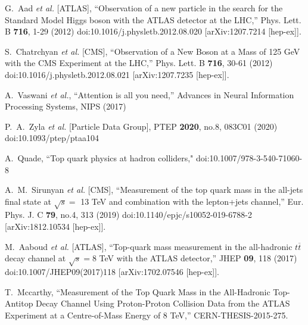 \begin{thebibliography}{99}

G.~Aad \textit{et al.} [ATLAS],
``Observation of a new particle in the search for the Standard Model Higgs boson with the ATLAS detector at the LHC,''
Phys. Lett. B \textbf{716}, 1-29 (2012)
doi:10.1016/j.physletb.2012.08.020
[arXiv:1207.7214 [hep-ex]].

S.~Chatrchyan \textit{et al.} [CMS],
``Observation of a New Boson at a Mass of 125 GeV with the CMS Experiment at the LHC,''
Phys. Lett. B \textbf{716}, 30-61 (2012)
doi:10.1016/j.physletb.2012.08.021
[arXiv:1207.7235 [hep-ex]].

A.~Vaswani \textit{et al.},
``Attention is all you need,''
Advances in Neural Information Processing Systems, NIPS (2017)

P.~A.~Zyla \textit{et al.} [Particle Data Group],
PTEP \textbf{2020}, no.8, 083C01 (2020)
doi:10.1093/ptep/ptaa104

A.~Quade,
``Top quark physics at hadron colliders,"
doi:10.1007/978-3-540-71060-8

A.~M.~Sirunyan \textit{et al.} [CMS],
``Measurement of the top quark mass in the all-jets final state at $\sqrt{s} =$ 13 TeV and combination with the lepton+jets channel,''
Eur. Phys. J. C \textbf{79}, no.4, 313 (2019)
doi:10.1140/epjc/s10052-019-6788-2
[arXiv:1812.10534 [hep-ex]].

M.~Aaboud \textit{et al.} [ATLAS],
``Top-quark mass measurement in the all-hadronic $ t\overline{t} $ decay channel at $ \sqrt{s}=8 $ TeV with the ATLAS detector,''
JHEP \textbf{09}, 118 (2017)
doi:10.1007/JHEP09(2017)118
[arXiv:1702.07546 [hep-ex]].

T.~Mccarthy,
``Measurement of the Top Quark Mass in the All-Hadronic Top-Antitop Decay Channel Using Proton-Proton Collision Data from the ATLAS Experiment at a Centre-of-Mass Energy of 8 TeV,''
CERN-THESIS-2015-275.


\end{thebibliography}
